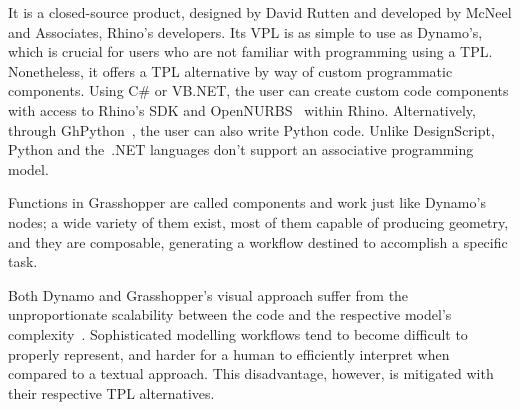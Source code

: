 It is a closed-source product, designed by David Rutten and developed by McNeel
and Associates, Rhino's developers.  Its \ac{VPL} is as simple to use as
Dynamo's, which is crucial for users who are not familiar with programming using
a \ac{TPL}.  Nonetheless, it offers a \ac{TPL} alternative by way of custom
programmatic components.  Using C\# or VB.NET, the user can create custom code
components with access to Rhino's \ac{SDK} and
OpenNURBS~\cite{Lear:2018:openNURBS} within Rhino.  Alternatively, through
GhPython~\cite{Giulio:2017:GhPython}, the user can also write Python code.
Unlike DesignScript, Python and the~.NET languages don't support an associative
programming model.

Functions in Grasshopper are called components and work just like Dynamo's
nodes; a wide variety of them exist, most of them capable of producing geometry,
and they are composable, generating a workflow destined to accomplish a specific
task.

Both Dynamo and Grasshopper's visual approach suffer from the unproportionate
scalability between the code and the respective model's
complexity~\cite{Leitao:2013:PESLGD}.  Sophisticated modelling workflows tend to
become difficult to properly represent, and harder for a human to efficiently
interpret when compared to a textual approach.  This disadvantage, however, is
mitigated with their respective \ac{TPL} alternatives.
